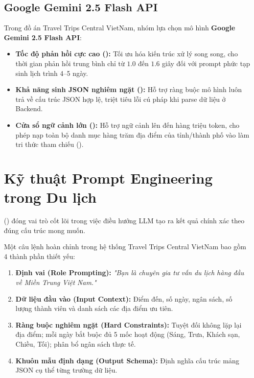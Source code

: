 \subsection{Google Gemini 2.5 Flash API}

Trong đồ án Travel Trips Central VietNam, nhóm lựa chọn mô hình \textbf{Google Gemini 2.5 Flash API}:
\begin{itemize}
    \item \textbf{Tốc độ phản hồi cực cao ():} Tối ưu hóa kiến trúc xử lý song song, cho thời gian phản hồi trung bình chỉ từ $1.0$ đến $1.6$ giây đối với prompt phức tạp sinh lịch trình 4--5 ngày.
    \item \textbf{Khả năng sinh JSON nghiêm ngặt ():} Hỗ trợ ràng buộc mô hình luôn trả về cấu trúc JSON hợp lệ, triệt tiêu lỗi cú pháp khi parse dữ liệu ở Backend.
    \item \textbf{Cửa sổ ngữ cảnh lớn ():} Hỗ trợ ngữ cảnh lên đến hàng triệu token, cho phép nạp toàn bộ danh mục hàng trăm địa điểm của tỉnh/thành phố vào làm tri thức tham chiếu ().
\end{itemize}

\section{Kỹ thuật Prompt Engineering trong Du lịch}

 () đóng vai trò cốt lõi trong việc điều hướng LLM tạo ra kết quả chính xác theo đúng cấu trúc mong muốn.

\begin{vidu}
Một câu lệnh hoàn chỉnh trong hệ thống Travel Trips Central VietNam bao gồm 4 thành phần thiết yếu:
\begin{enumerate}
    \item \textbf{Định vai (Role Prompting):} \textit{"Bạn là chuyên gia tư vấn du lịch hàng đầu về Miền Trung Việt Nam."}
    \item \textbf{Dữ liệu đầu vào (Input Context):} Điểm đến, số ngày, ngân sách, số lượng thành viên và danh sách các địa điểm ưu tiên.
    \item \textbf{Ràng buộc nghiêm ngặt (Hard Constraints):} Tuyệt đối không lặp lại địa điểm; mỗi ngày bắt buộc đủ 5 mốc hoạt động (Sáng, Trưa, Khách sạn, Chiều, Tối); phân bổ ngân sách thực tế.
    \item \textbf{Khuôn mẫu định dạng (Output Schema):} Định nghĩa cấu trúc mảng JSON cụ thể từng trường dữ liệu.
\end{enumerate}
\end{vidu}

